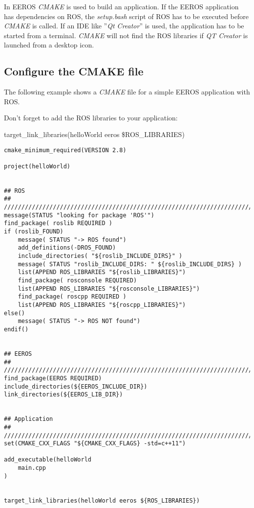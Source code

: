 In EEROS \textit{CMAKE} is used to build an application.
If the EEROS application has dependencies on ROS, the \textit{setup.bash} script of ROS has to be executed before \textit{CMAKE} is called.
If an IDE like ''\textit{Qt Creator}'' is used, the application has to be started from a terminal.
\textit{CMAKE} will not find the ROS libraries if \textit{QT Creator} is launched from a desktop icon.

\subsection{Configure the CMAKE file}
The following example shows a \textit{CMAKE} file for a simple EEROS application with ROS.

Don't forget to add the ROS libraries to your application:
\begin{snugshade*}
	target\_link\_libraries(helloWorld eeros \${ROS\_LIBRARIES})
\end{snugshade*}

\lstset{language=c}
\begin{lstlisting}
cmake_minimum_required(VERSION 2.8)
 
project(helloWorld)


## ROS
## ////////////////////////////////////////////////////////////////////////
message(STATUS "looking for package 'ROS'")
find_package( roslib REQUIRED )
if (roslib_FOUND)
	message( STATUS "-> ROS found")
	add_definitions(-DROS_FOUND)
	include_directories( "${roslib_INCLUDE_DIRS}" )
	message( STATUS "roslib_INCLUDE_DIRS: " ${roslib_INCLUDE_DIRS} )
	list(APPEND ROS_LIBRARIES "${roslib_LIBRARIES}")
	find_package( rosconsole REQUIRED)
	list(APPEND ROS_LIBRARIES "${rosconsole_LIBRARIES}")
	find_package( roscpp REQUIRED )
	list(APPEND ROS_LIBRARIES "${roscpp_LIBRARIES}")
else()
	message( STATUS "-> ROS NOT found")
endif()


## EEROS
## ////////////////////////////////////////////////////////////////////////
find_package(EEROS REQUIRED)
include_directories(${EEROS_INCLUDE_DIR})
link_directories(${EEROS_LIB_DIR})


## Application
## ////////////////////////////////////////////////////////////////////////
set(CMAKE_CXX_FLAGS "${CMAKE_CXX_FLAGS} -std=c++11")
 
add_executable(helloWorld
	main.cpp	
)


target_link_libraries(helloWorld eeros ${ROS_LIBRARIES})

\end{lstlisting}

